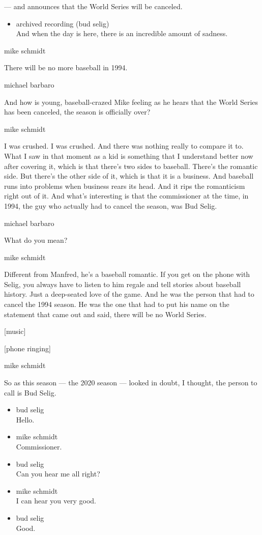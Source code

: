 --- and announces that the World Series will be canceled.

\begin{itemize}
\tightlist
\item
  archived recording (bud selig)\\
  And when the day is here, there is an incredible amount of sadness.
\end{itemize}

mike schmidt

There will be no more baseball in 1994.

michael barbaro

And how is young, baseball-crazed Mike feeling as he hears that the
World Series has been canceled, the season is officially over?

mike schmidt

I was crushed. I was crushed. And there was nothing really to compare it
to. What I saw in that moment as a kid is something that I understand
better now after covering it, which is that there's two sides to
baseball. There's the romantic side. But there's the other side of it,
which is that it is a business. And baseball runs into problems when
business rears its head. And it rips the romanticism right out of it.
And what's interesting is that the commissioner at the time, in 1994,
the guy who actually had to cancel the season, was Bud Selig.

michael barbaro

What do you mean?

mike schmidt

Different from Manfred, he's a baseball romantic. If you get on the
phone with Selig, you always have to listen to him regale and tell
stories about baseball history. Just a deep-seated love of the game. And
he was the person that had to cancel the 1994 season. He was the one
that had to put his name on the statement that came out and said, there
will be no World Series.

{[}music{]}

{[}phone ringing{]}

mike schmidt

So as this season --- the 2020 season --- looked in doubt, I thought,
the person to call is Bud Selig.

\begin{itemize}
\item
  bud selig\\
  Hello.
\item
  mike schmidt\\
  Commissioner.
\item
  bud selig\\
  Can you hear me all right?
\item
  mike schmidt\\
  I can hear you very good.
\item
  bud selig\\
  Good.
\end{itemize}

